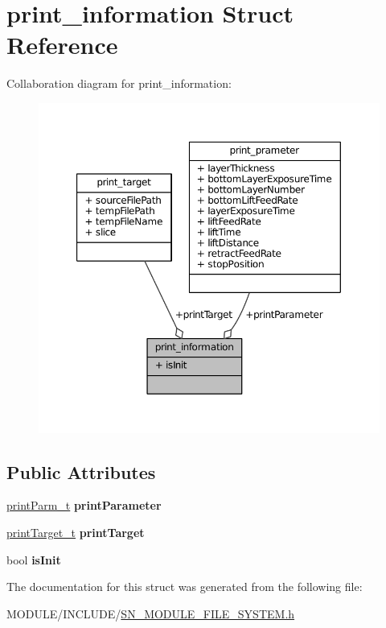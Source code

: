 \hypertarget{structprint__information}{}\section{print\+\_\+information Struct Reference}
\label{structprint__information}


Collaboration diagram for print\+\_\+information\+:\nopagebreak
\begin{figure}[H]
\begin{center}
\leavevmode
\includegraphics[width=350pt]{structprint__information__coll__graph}
\end{center}
\end{figure}
\subsection*{Public Attributes}
\begin{DoxyCompactItemize}
\item 
\mbox{\label{structprint__information_ab1a5b824e5f9fc9b5793a1bd71d01c98}} 
\hyperlink{structprint__prameter}{print\+Parm\+\_\+t} {\bfseries print\+Parameter}
\item 
\mbox{\label{structprint__information_a98b886a1c26c29439e6fa51a43c8e1c1}} 
\hyperlink{structprint__target}{print\+Target\+\_\+t} {\bfseries print\+Target}
\item 
\mbox{\label{structprint__information_a479dc171d4f727af3801b5c44b291f6b}} 
bool {\bfseries is\+Init}
\end{DoxyCompactItemize}


The documentation for this struct was generated from the following file\+:\begin{DoxyCompactItemize}
\item 
M\+O\+D\+U\+L\+E/\+I\+N\+C\+L\+U\+D\+E/\hyperlink{SN__MODULE__FILE__SYSTEM_8h}{S\+N\+\_\+\+M\+O\+D\+U\+L\+E\+\_\+\+F\+I\+L\+E\+\_\+\+S\+Y\+S\+T\+E\+M.\+h}\end{DoxyCompactItemize}
